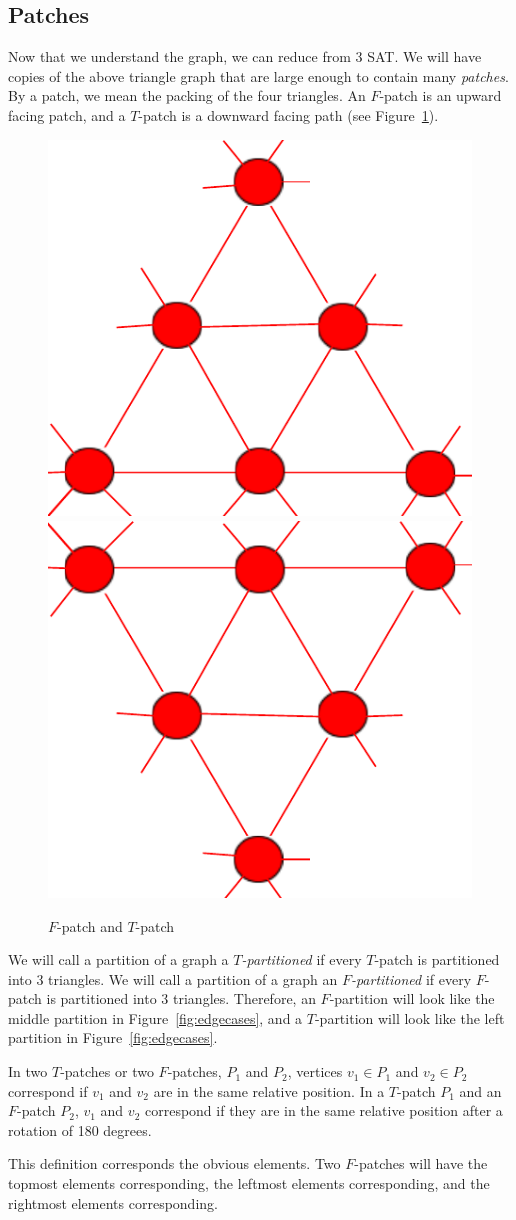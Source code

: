 \documentclass[runningheads,a4paper]{llncs}
\begin{document}
\subsection{Patches}

Now that we understand the graph, we can reduce from 3 SAT. We will have copies of the above triangle graph that are large enough to contain many \emph{patches}. By a patch, we mean the packing of the four triangles. An $F$-patch is an upward facing patch, and a $T$-patch is a downward facing path (see Figure~\ref{fig:patches}).

\begin{figure}[h]
\label{fig:patches}
\centering
\includegraphics[width=0.2\linewidth]{Tpatch.pdf} \qquad
\includegraphics[width=0.2\linewidth]{Fpatch.pdf}
\caption{$F$-patch and $T$-patch}
\end{figure}

We will call a partition of a graph a \emph{$T$-partitioned} if every $T$-patch is partitioned into 3 triangles. We will call a partition of a graph an \emph{$F$-partitioned} if every $F$-patch is partitioned into $3$ triangles. Therefore, an $F$-partition will look like the middle partition in Figure~\ref{fig:edgecases}, and a $T$-partition will look like the left partition in Figure~\ref{fig:edgecases}.

\begin{definition}
In two $T$-patches or two $F$-patches, $P_1$ and $P_2$, vertices $v_1 \in P_1$ and $v_2 \in P_2$ correspond if $v_1$ and $v_2$ are in the same relative position. In a $T$-patch $P_1$ and an $F$-patch $P_2$, $v_1$ and $v_2$ correspond if they are in the same relative position after a rotation of 180 degrees.
\end{definition}

This definition corresponds the obvious elements. Two $F$-patches will have the topmost elements corresponding, the leftmost elements corresponding, and the rightmost elements corresponding. 
\end{document}
